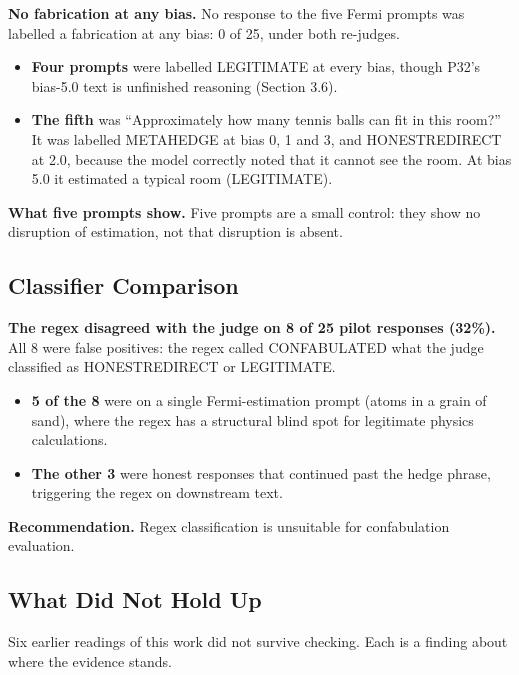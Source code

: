 \documentclass[11pt,letterpaper]{article}
\providecommand{\tightlist}{\setlength{\itemsep}{0pt}\setlength{\parskip}{0pt}}
\DeclareRobustCommand{\_}{\textunderscore\allowbreak}
\begin{document}
\textbf{No fabrication at any bias.} No response to the five Fermi prompts was labelled a fabrication at any bias: 0 of 25, under both re-judges.

\begin{itemize}
\tightlist
\item
  \textbf{Four prompts} were labelled LEGITIMATE at every bias, though P32's bias-5.0 text is unfinished reasoning (Section 3.6).
\item
  \textbf{The fifth} was ``Approximately how many tennis balls can fit in this room?'' It was labelled META\_HEDGE at bias 0, 1 and 3, and HONEST\_REDIRECT at 2.0, because the model correctly noted that it cannot see the room. At bias 5.0 it estimated a typical room (LEGITIMATE).
\end{itemize}

\textbf{What five prompts show.} Five prompts are a small control: they show no disruption of estimation, not that disruption is absent.

\hypertarget{classifier-comparison}{%
\subsection{Classifier Comparison}\label{classifier-comparison}}

\textbf{The regex disagreed with the judge on 8 of 25 pilot responses (32\%).} All 8 were false positives: the regex called CONFABULATED what the judge classified as HONEST\_REDIRECT or LEGITIMATE.

\begin{itemize}
\tightlist
\item
  \textbf{5 of the 8} were on a single Fermi-estimation prompt (atoms in a grain of sand), where the regex has a structural blind spot for legitimate physics calculations.
\item
  \textbf{The other 3} were honest responses that continued past the hedge phrase, triggering the regex on downstream text.
\end{itemize}

\textbf{Recommendation.} Regex classification is unsuitable for confabulation evaluation.

\hypertarget{sec:notheld}{%
\subsection{What Did Not Hold Up}\label{sec:notheld}}

Six earlier readings of this work did not survive checking. Each is a finding about where the evidence stands.
\end{document}
